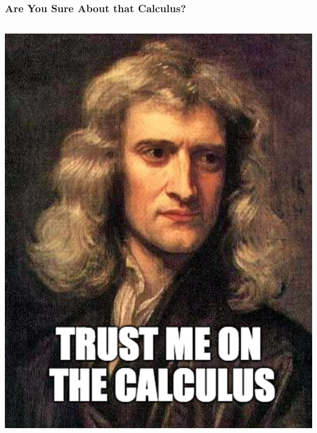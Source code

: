 \documentclass{beamer}
\begin{document}
\begin{frame}
  \frametitle{Are You Sure About that Calculus?}
  \begin{columns}
    \includegraphics[width=\textwidth]{images/newton_meme.png}
  \end{columns}
\end{frame}
\end{document}
